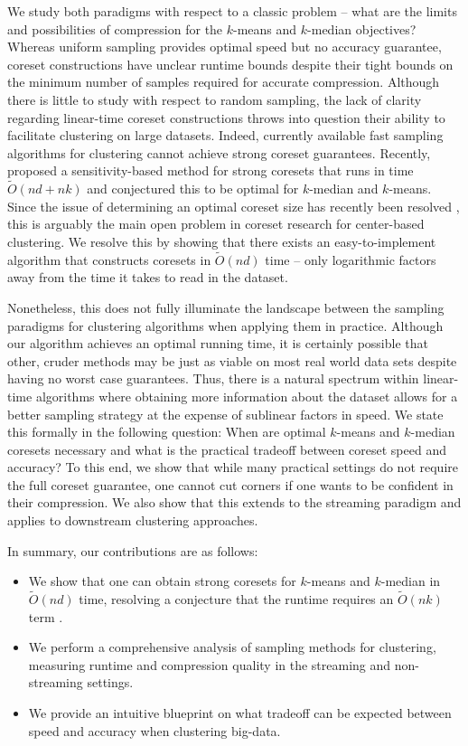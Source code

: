 We study both paradigms with respect to a classic problem -- what are the limits and possibilities of compression for the $k$-means and $k$-median objectives?
Whereas uniform sampling provides optimal speed but no accuracy guarantee, coreset constructions have unclear runtime bounds despite their tight bounds on the
minimum number of samples required for accurate compression. Although there is little to study with respect to random sampling, the lack of clarity regarding
linear-time coreset constructions throws into question their ability to facilitate clustering on large datasets. Indeed, currently available fast sampling
algorithms for clustering \cite{BachemL018} \cite{kmeans_sublinear_bachem16} cannot achieve strong coreset guarantees.  Recently, \cite{DSWY22} proposed
a sensitivity-based method for strong coresets that runs in time $\tilde{O}(nd + nk)$ and conjectured this to be optimal for $k$-median and $k$-means.  Since
the issue of determining an optimal coreset size has recently been resolved \cite{CSS21,CLSSS22,HLW23}, this is arguably the main open problem in coreset
research for center-based clustering. We resolve this by showing that there exists an easy-to-implement algorithm that constructs coresets in $\tilde{O}(nd)$
time -- only logarithmic factors away from the time it takes to read in the dataset.

Nonetheless, this does not fully illuminate the landscape between the sampling paradigms for clustering algorithms when applying them in practice. Although our
algorithm achieves an optimal running time, it is certainly possible that other, cruder methods may be just as viable on most real world data sets despite
having no worst case guarantees.  Thus, there is a natural spectrum within linear-time algorithms where obtaining more information about the dataset allows for
a better sampling strategy at the expense of sublinear factors in speed. We state this formally in the following question: When are optimal $k$-means and
$k$-median coresets necessary and what is the practical tradeoff between coreset speed and accuracy? To this end, we show that while many practical settings do
not require the full coreset guarantee, one cannot cut corners if one wants to be confident in their compression. We also show that this extends to the
streaming paradigm and applies to downstream clustering approaches.

In summary, our contributions are as follows:
\begin{itemize}
    \begin{itemize}
        \item We show that one can obtain strong coresets for $k$-means and $k$-median in $\tilde{O}(nd)$ time, resolving a conjecture that the runtime
            requires an $\tilde{O}(nk)$ term \cite{DSWY22}.
        \item We perform a comprehensive analysis of sampling methods for clustering, measuring runtime and compression quality in the
            streaming and non-streaming settings. 
        \item We provide an intuitive blueprint on what tradeoff can be expected between speed and accuracy when clustering big-data.
    \end{itemize}
\end{itemize}
